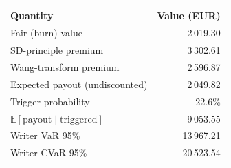 \begin{tabular}{lr}
\toprule
Quantity & Value (EUR) \\
\midrule
Fair (burn) value & 2\,019.30 \\
SD-principle premium & 3\,302.61 \\
Wang-transform premium & 2\,596.87 \\
Expected payout (undiscounted) & 2\,049.82 \\
Trigger probability & 22.6\% \\
$\mathbb{E}[\text{payout}\mid\text{triggered}]$ & 9\,053.55 \\
Writer VaR 95\% & 13\,967.21 \\
Writer CVaR 95\% & 20\,523.54 \\
\bottomrule
\end{tabular}
